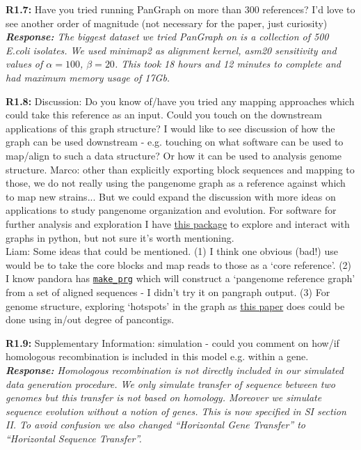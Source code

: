 \documentclass[aps,rmp,onecolumn]{revtex4-1}
\newcommand{\Marco}[1]{{\color{gray}Marco: #1}}
\newcommand{\Liam}[1]{{\color{teal}Liam: #1}}
\newcommand{\reviewer}[2]{\textbf{#1:} #2\vskip 5mm}
\newcommand{\response}[1]{{\it {\color{response}\textbf{Response:} #1}}\vskip 5mm}
\begin{document}
\reviewer{R1.7}{Have you tried running PanGraph on more than 300 references? I'd love to see another order of magnitude (not necessary for the paper, just curiosity)}
\response{The biggest dataset we tried PanGraph on is a collection of 500 E.coli isolates. We used minimap2 as alignment kernel, asm20 sensitivity and values of $\alpha = 100$, $\beta=20$. This took 18 hours and 12 minutes to complete and had maximum memory usage of 17Gb.}

\reviewer{R1.8}{Discussion: Do you know of/have you tried any mapping approaches which could take this reference as an input. Could you touch on the downstream applications of this graph structure? I would like to see discussion of how the graph can be used downstream - e.g. touching on what software can be used to map/align to such a data structure? Or how it can be used to analysis genome structure.}
\Marco{other than explicitly exporting block sequences and mapping to those, we do not really using the pangenome graph as a reference against which to map new strains... But we could expand the discussion with more ideas on applications to study pangenome organization and evolution. For software for further analysis and exploration I have \href{https://github.com/mmolari/pypangraph}{this package} to explore and interact with graphs in python, but not sure it's worth mentioning.}\\
\Liam{Some ideas that could be mentioned. (1) I think one obvious (bad!) use would be to take the core blocks and map reads to those as a `core reference'. (2) I know pandora has \href{https://github.com/iqbal-lab-org/make_prg/}{\texttt{make\_prg}} which will construct a `pangenome reference graph' from a set of aligned sequences - I didn't try it on pangraph output. (3) For genome structure, exploring `hotspots' in the graph as \href{https://www.nature.com/articles/s41467-017-00808-w}{this paper} does could be done using in/out degree of pancontigs.}

\reviewer{R1.9}{Supplementary Information: simulation - could you comment on how/if homologous recombination is included in this model e.g. within a gene.}
\response{Homologous recombination is not directly included in our simulated data generation procedure. We only simulate transfer of sequence between two genomes but this transfer is not based on homology. Moreover we simulate sequence evolution without a notion of genes. This is now specified in SI section II. To avoid confusion we also changed ``Horizontal Gene Transfer'' to ``Horizontal Sequence Transfer''.}
\end{document}

